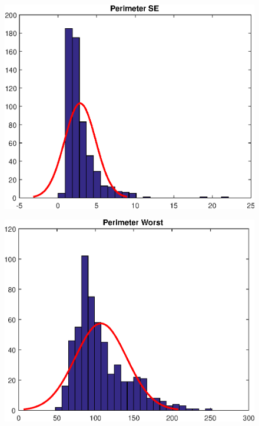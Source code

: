 \documentclass[11pt,a4paper]{article}
\numberwithin{equation}{section}
\begin{document}
\begin{itemize}
\begin{figure}[H]
\centering
\begin{minipage}{.4\textwidth}
  \centering
  \includegraphics[width=\linewidth]{./img/perimeter_se}
  \label{fig:test1}
\end{minipage}%
\begin{minipage}{.4\textwidth}
  \centering
  \includegraphics[width=\linewidth]{./img/perimeter_worst}
  \label{fig:test2}
\end{minipage}
\end{figure}



\end{itemize}
\end{document}
